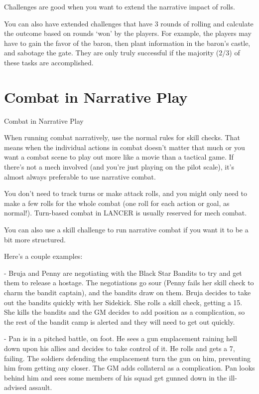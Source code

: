 Challenges are good when you want to extend the narrative impact of rolls.   

You can also have extended challenges that have 3 rounds of rolling and calculate the outcome  
based on rounds ‘won’ by the players. For example, the players may have to gain the favor of the  
baron, then plant information in the baron’s castle, and sabotage the gate. They are only truly  
successful if the majority (2/3) of these tasks are accomplished.  

\section{Combat in Narrative Play}
                                      Combat in Narrative Play
 

When running combat narratively, use the normal rules for skill checks. That means when the  
individual actions in combat doesn’t matter that much or you want a combat scene to play out  
more like a movie than a tactical game. If there’s not a mech involved (and you’re just playing on  
the pilot scale), it’s almost always preferable to use narrative combat.
 

                                                                                                                   


You don’t need to track turns or make attack rolls, and you might only need to make a few rolls  
for the whole combat (one roll for each action or goal, as normal!). Turn-based combat in  
LANCER is usually reserved for mech combat.
 

You can also use a skill challenge to run narrative combat if you want it to be a bit more  
structured.
 

Here’s a couple examples:
 
	        - Bruja and Penny are negotiating with the Black Star Bandits to try and get them to  
release a hostage. The negotiations go sour (Penny fails her skill check to charm the bandit  
captain), and the bandits draw on them. Bruja decides to take out the bandits quickly with her  
Sidekick. She rolls a skill check, getting a 15. She kills the bandits and the GM decides to add  
position as a complication, so the rest of the bandit camp is alerted and they will need to get out  
quickly.
 
	        - Pan is in a pitched battle, on foot. He sees a gun emplacement raining hell down upon  
his allies and decides to take control of it. He rolls and gets a 7, failing. The soldiers defending  
the emplacement turn the gun on him, preventing him from getting any closer. The GM adds  
collateral as a complication. Pan looks behind him and sees some members of his squad get  
gunned down in the ill-advised assault.
 
